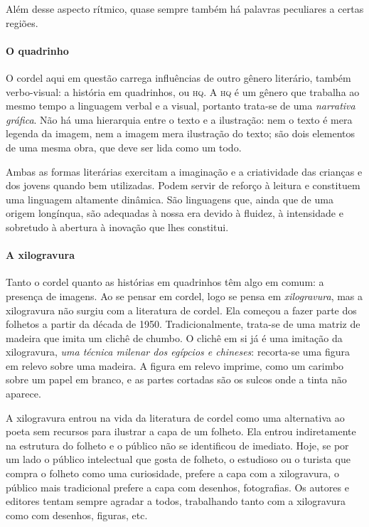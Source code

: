 \documentclass[11pt]{extarticle}
\begin{document}
Além desse aspecto rítmico, quase sempre também há palavras peculiares a certas
regiões.

\paragraph{O quadrinho}

O cordel aqui em questão carrega influências de outro gênero literário, também
verbo-visual: a história em quadrinhos, ou \textsc{hq}. A \textsc{hq} é um 
gênero que trabalha ao mesmo tempo a linguagem verbal e a visual, portanto trata-se de 
uma \textit{narrativa gráfica}. Não há uma hierarquia entre o texto e a ilustração: nem 
o texto é mera legenda da imagem, nem a imagem mera ilustração do texto; são dois elementos 
de uma mesma obra, que deve ser lida como um todo.

Ambas as formas literárias exercitam a imaginação e a criatividade das crianças e dos jovens quando bem utilizadas. Podem servir de reforço à leitura e constituem uma linguagem altamente dinâmica.  São linguagens que, ainda que de uma origem longínqua, são adequadas à nossa era devido à fluidez, à intensidade e sobretudo à abertura à inovação que lhes constitui.

\paragraph{A xilogravura}

Tanto o cordel quanto as histórias em quadrinhos têm algo em comum:
a presença de imagens. Ao se pensar em cordel, logo se pensa em \textit{xilogravura}, 
mas a xilogravura não surgiu com a literatura de cordel. Ela começou a fazer
parte dos folhetos a partir da década de 1950. Tradicionalmente, trata-se
de uma matriz de madeira que imita um clichê de chumbo. O clichê em si 
já é uma imitação da xilogravura, \textit{uma técnica milenar dos egípcios
e chineses}: recorta-se uma figura em relevo sobre uma madeira. A figura 
em relevo imprime, como um carimbo sobre um papel em branco, e as partes
cortadas são os sulcos onde a tinta não aparece. 

A xilogravura entrou na vida da literatura de cordel como uma alternativa 
ao poeta sem recursos para ilustrar a capa de um folheto. Ela entrou indiretamente na 
estrutura do folheto e o público não se identificou de imediato. Hoje, se por um lado 
o público intelectual que gosta de folheto, o estudioso ou o turista que compra o 
folheto como uma curiosidade, prefere a capa com a xilogravura, o público mais 
tradicional prefere a capa com desenhos, fotografias. 
Os autores e editores tentam sempre agradar a todos, trabalhando tanto com a xilogravura 
como com desenhos, figuras, etc.
\end{document}
